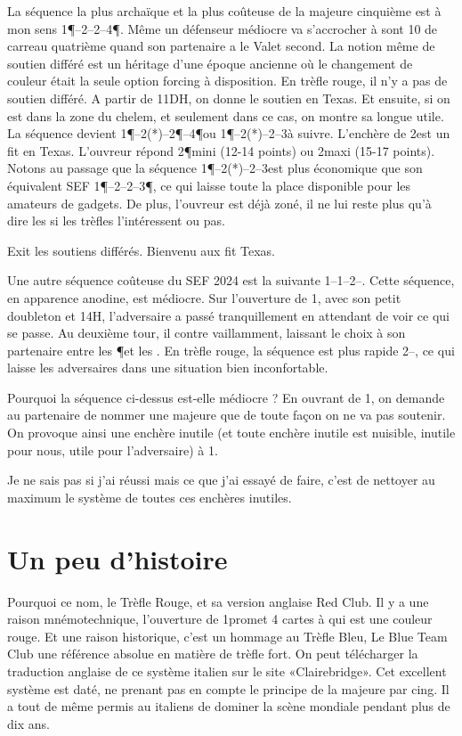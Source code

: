 La séquence la plus archaïque et la plus coûteuse de la majeure cinquième est à mon sens
1\P--2\T--2\K--4\P. Même un défenseur médiocre va s'accrocher à sont 10 de carreau quatrième quand son partenaire a le Valet second. La notion même de soutien différé est un héritage d'une époque ancienne où le changement de couleur était la seule option forcing à disposition. En trèfle rouge, il n'y a pas de soutien différé. A partir de 11DH, on donne le soutien en Texas. Et ensuite, si on est dans la zone du chelem, et seulement dans ce cas, on montre sa longue utile. La séquence devient 1\P--2\C(*)--2\P--4\P ou 1\P--2\C(*)--2\NT--3\T à suivre. L'enchère de 2\C est un fit en Texas. L'ouvreur répond 2\P mini (12-14 points) ou 2\NT maxi (15-17 points). Notons au passage que la séquence 1\P--2\C(*)--2\NT--3\T est plus économique que son équivalent SEF 1\P--2\T--2\K--3\P, ce qui laisse toute la place disponible pour les amateurs de gadgets. De plus, l'ouvreur est déjà zoné, il ne lui reste plus qu'à dire les si les trèfles l'intéressent ou pas.

Exit les soutiens différés. Bienvenu aux fit Texas.

Une autre séquence coûteuse du SEF 2024 est la suivante 1\K--1\C--2\K--\Pass. Cette séquence, en apparence anodine, est médiocre. Sur l'ouverture de 1\K, avec son petit doubleton \C et 14H, l'adversaire a passé tranquillement en attendant de voir ce qui se passe. Au deuxième tour, il contre vaillamment, laissant le choix à son partenaire entre les \P et les \T. En trèfle rouge, la séquence est plus rapide 2\K--\Pass, ce qui laisse les adversaires dans une situation bien inconfortable.

Pourquoi la séquence ci-dessus est-elle médiocre ? En ouvrant de 1\K, on demande au partenaire de nommer une majeure que de toute façon on ne va pas soutenir. On provoque ainsi une enchère inutile (et toute enchère inutile est nuisible, inutile pour nous, utile pour l'adversaire) à 1\C.

Je ne sais pas si j'ai réussi mais ce que j'ai essayé de faire, c'est de nettoyer au maximum le système de toutes ces enchères inutiles.

\section{Un peu d'histoire}

Pourquoi ce nom, le Trèfle Rouge, et sa version anglaise Red Club. Il y a une raison mnémotechnique, l'ouverture de 1\T promet 4 cartes à \C qui est une couleur rouge. Et une raison historique, c'est un hommage au Trèfle Bleu, Le Blue Team Club une référence absolue en matière de trèfle fort. On peut télécharger la traduction anglaise de ce système italien sur le site «Clairebridge». Cet excellent système est daté, ne prenant pas en compte le principe de la majeure par cing. Il a tout de même permis au italiens de dominer la scène mondiale pendant plus de dix ans.

